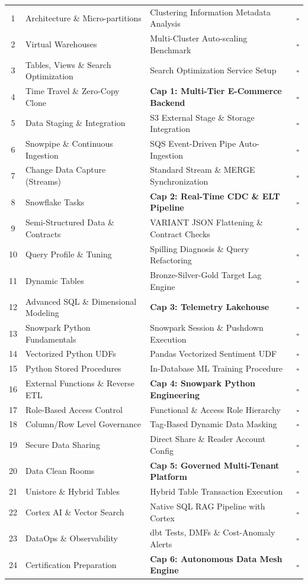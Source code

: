 \documentclass[11pt, a4paper]{article}
\begin{document}
\begin{center}
\begin{longtable}{@{} c l p{7cm} c @{}}
1 & Architecture \& Micro-partitions & Clustering Information Metadata Analysis & $\square$ \\
2 & Virtual Warehouses & Multi-Cluster Auto-scaling Benchmark & $\square$ \\
3 & Tables, Views \& Search Optimization & Search Optimization Service Setup & $\square$ \\
4 & Time Travel \& Zero-Copy Clone & \textbf{Cap 1: Multi-Tier E-Commerce Backend} & $\square$ \\
\midrule
5 & Data Staging \& Integration & S3 External Stage \& Storage Integration & $\square$ \\
6 & Snowpipe \& Continuous Ingestion & SQS Event-Driven Pipe Auto-Ingestion & $\square$ \\
7 & Change Data Capture (Streams) & Standard Stream \& MERGE Synchronization & $\square$ \\
8 & Snowflake Tasks & \textbf{Cap 2: Real-Time CDC \& ELT Pipeline} & $\square$ \\
\midrule
9 & Semi-Structured Data \& Contracts & VARIANT JSON Flattening \& Contract Checks & $\square$ \\
10 & Query Profile \& Tuning & Spilling Diagnosis \& Query Refactoring & $\square$ \\
11 & Dynamic Tables & Bronze-Silver-Gold Target Lag Engine & $\square$ \\
12 & Advanced SQL \& Dimensional Modeling & \textbf{Cap 3: Telemetry Lakehouse} & $\square$ \\
\midrule
13 & Snowpark Python Fundamentals & Snowpark Session \& Pushdown Execution & $\square$ \\
14 & Vectorized Python UDFs & Pandas Vectorized Sentiment UDF & $\square$ \\
15 & Python Stored Procedures & In-Database ML Training Procedure & $\square$ \\
16 & External Functions \& Reverse ETL & \textbf{Cap 4: Snowpark Python Engineering} & $\square$ \\
\midrule
17 & Role-Based Access Control & Functional \& Access Role Hierarchy & $\square$ \\
18 & Column/Row Level Governance & Tag-Based Dynamic Data Masking & $\square$ \\
19 & Secure Data Sharing & Direct Share \& Reader Account Config & $\square$ \\
20 & Data Clean Rooms & \textbf{Cap 5: Governed Multi-Tenant Platform} & $\square$ \\
\midrule
21 & Unistore \& Hybrid Tables & Hybrid Table Transaction Execution & $\square$ \\
22 & Cortex AI \& Vector Search & Native SQL RAG Pipeline with Cortex & $\square$ \\
23 & DataOps \& Observability & dbt Tests, DMFs \& Cost-Anomaly Alerts & $\square$ \\
24 & Certification Preparation & \textbf{Cap 6: Autonomous Data Mesh Engine} & $\square$ \\

\end{longtable}
\end{center}
\end{document}
